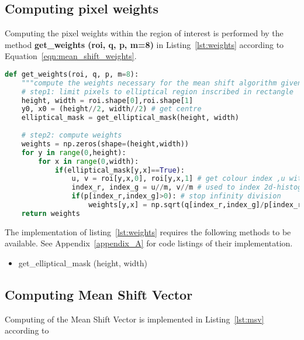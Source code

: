 \subsection{Computing pixel weights}
Computing the pixel weights within the region of interest is performed by the
method \textbf{get\_weights (roi, q, p, m=8)} in Listing~\ref{lst:weights} according to Equation~\ref{eqn:mean_shift_weights}.

\begin{lstlisting}[language=Python, caption={Computing Mean Shift Weights}, captionpos=b, label={lst:weights}]
def get_weights(roi, q, p, m=8):
    """compute the weights necessary for the mean shift algorithm given target and candidate distributions q and p"""
    # step1: limit pixels to elliptical region inscribed in rectangle
    height, width = roi.shape[0],roi.shape[1]
    y0, x0 = (height//2, width//2) # get centre 
    elliptical_mask = get_elliptical_mask(height, width)
    
    # step2: compute weights
    weights = np.zeros(shape=(height,width))
    for y in range(0,height):
        for x in range(0,width): 
            if(elliptical_mask[y,x]==True):  
                u, v = roi[y,x,0], roi[y,x,1] # get colour index ,u with which we can index the histograms
                index_r, index_g = u//m, v//m # used to index 2d-histogram
                if(p[index_r,index_g]>0): # stop infinity division
                    weights[y,x] = np.sqrt(q[index_r,index_g]/p[index_r,index_g]) # compute weights based on equation
    return weights 
\end{lstlisting}

The implementation of listing~\ref{lst:weights} requires the following methods to
be available. See Appendix~\ref{appendix_A} for code listings of their implementation. 
\begin{itemize}
    \item get\_elliptical\_mask (height, width)
\end{itemize}

\subsection{Computing Mean Shift Vector}
Computing of the Mean Shift Vector is implemented in Listing~\ref{lst:msv}
according to %

